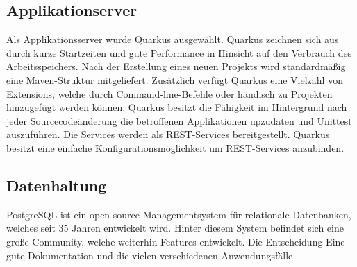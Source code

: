 \subsection{Applikationserver}
Als Applikationsserver wurde Quarkus ausgewählt. Quarkus zeichnen sich aus durch kurze Startzeiten und gute Performance in Hinsicht auf den Verbrauch des Arbeitsspeichers. Nach der Erstellung eines neuen Projekts wird standardmäßig eine Maven-Struktur mitgeliefert. Zusätzlich verfügt Quarkus eine Vielzahl von Extensions, welche durch Command-line-Befehle oder händisch zu Projekten hinzugefügt werden können. \cite{QuarkusAbout, QuarkusFirstApplication}
Quarkus besitzt die Fähigkeit im Hintergrund nach jeder Sourcecodeänderung die betroffenen Applikationen upzudaten und Unittest auszuführen.
Die Services werden als REST-Services bereitgestellt. Quarkus besitzt eine einfache Konfigurationsmöglichkeit um REST-Services anzubinden. 

\subsection{Datenhaltung}
PostgreSQL ist ein open source Managementsystem für relationale Datenbanken, welches seit 35 Jahren entwickelt wird. Hinter diesem System befindet sich eine große Community, welche weiterhin Features entwickelt. Die Entscheidung Eine gute Dokumentation und die vielen verschiedenen Anwendungsfälle \cite{PostgreSQLAbout}






